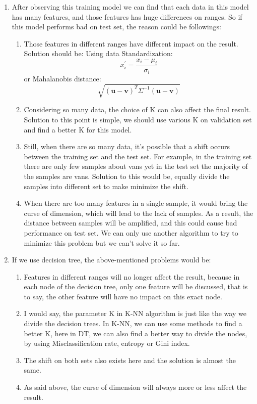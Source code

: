 \documentclass[12pt]{scrartcl}
\begin{document}
    \begin{enumerate}[label=\alph*)]
      \item 
After observing this training model we can find that each data in this model has many features, and those features has huge differences on ranges. So if this model performs bad on test set, the reason could be followings:
\begin{enumerate}[label=\arabic*.]
\item
Those features in different ranges have different impact on the result. Solution should be: Using data Standardization:
\[x^{'}_{i} = \frac{x_i - \mu_i}{\sigma_i}   \]
or Mahalanobis distance:
\[ \sqrt{(\textbf{u}-\textbf{v})^T\Sigma^{-1}(\textbf{u}-\textbf{v})}\]
\item
Considering so many data, the choice of K can also affect the final result. Solution to this point is simple, we should use various K on validation set and find a better K for this model.
\item
Still, when there are so many data, it's possible that a shift occurs between the training set and the test set. For example, in the training set there are only few samples about vans yet in the test set the majority of the samples are vans. Solution to this would be, equally divide the samples into different set to make minimize the shift.
\item
When there are too many features in a single sample, it would bring the curse of dimension, which will lead to the lack of samples. As a result, the distance between samples will be amplified, and this could cause bad performance on test set. We can only use another algorithm to try to minimize this problem but we can't solve it so far. 
\end{enumerate} 
\item
If we use decision tree, the above-mentioned problems would be:
\begin{enumerate}[label=\arabic*.]
\item
Features in different ranges will no longer affect the result, because in each node of the decision tree, only one feature will be discussed, that is to say, the other feature will have no impact on this exact node.
\item
I would say, the parameter K in K-NN algorithm is just like the way we divide the decision trees. In K-NN, we can use some methods to find a better K, here in DT, we can also find a better way to divide the nodes, by using Misclassification rate, entropy or Gini index.
\item
The shift on both sets also exists here and the solution is almost the same.
\item
As said above, the curse of dimension will always more or less affect the result.
\end{enumerate}
\end{enumerate} 
\end{document}
